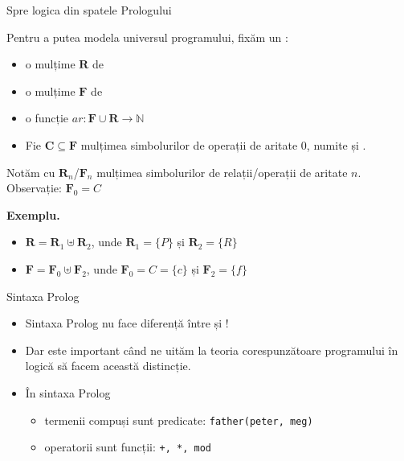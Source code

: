 \documentclass[xcolor=pdftex,romanian,colorlinks]{beamer}
\begin{document}
\begin{frame}{Spre logica din spatele Prologului}

Pentru a putea modela universul programului, fixăm un :
\begin{itemize}
	\item o mulțime $\mathbf{R}$ de 
	\item o mulțime $\mathbf{F}$ de 
	\item o funcție  $ar: \mathbf{F} \cup \mathbf{R} \to \mathbb{N}$
	\item Fie $\mathbf{C}\subseteq \mathbf{F}$ mulțimea simbolurilor de operații
	de aritate $0$, numite și .
\end{itemize}

Notăm cu $\mathbf{R}_n$/$\mathbf{F}_n$ mulțimea simbolurilor de relații/operații
de aritate $n$. Observație: $\mathbf{F}_0 = C$

\textbf{\color{True} Exemplu.}
\begin{itemize}
	\item $\mathbf{R} = \mathbf{R}_1 \uplus \mathbf{R}_2$, unde $\mathbf{R}_1 = \{P\}$ și $\mathbf{R}_2 = \{R\}$
	\item $\mathbf{F} = \mathbf{F}_0 \uplus \mathbf{F}_2$, unde $\mathbf{F}_0 = C = \{c\}$ și $\mathbf{F}_2 = \{f\}$
\end{itemize}


\end{frame}

\begin{frame}{Sintaxa Prolog}

\begin{itemize}
	\item {Sintaxa Prolog nu face diferență între  și !}
	\vfill
	\item Dar este important când ne uităm la teoria corespunzătoare programului în logică să facem această distincție.
	\vfill
    \item \^{I}n sintaxa Prolog
    \begin{itemize}
    \item termenii compuși sunt predicate: \texttt{father(peter, meg)}
    \item operatorii sunt funcții: \texttt{+, *, mod}
    \end{itemize}
\end{itemize}
\end{frame}
\end{document}

